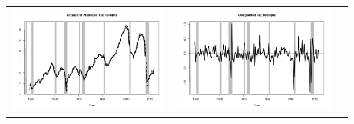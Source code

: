 \documentclass[12pt]{article}
\begin{document}
\begin{figure}
\begin{center}
\begin{tabular}{ccc}
\includegraphics[scale=0.34]{pics/taxrev.png} & \includegraphics[scale=0.34]{pics/unexp_tax.png}  \\ 
\end{tabular}
\end{center}
\end{figure}
\end{document}
